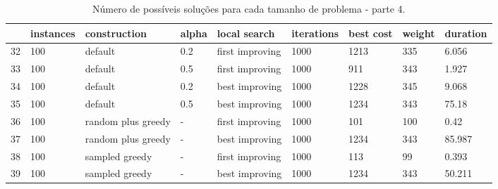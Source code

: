 \begin{landscape}
    \begin{table}
    \centering
    \begin{tabular}{lllllllll}
    \toprule
    {} & instances &        construction & alpha &     local search & iterations & best cost & weight & duration \\
    \midrule
    32 &       100 &             default &   0.2 &  first improving &       1000 &      1213 &    335 &    6.056 \\
    33 &       100 &             default &   0.5 &  first improving &       1000 &       911 &    343 &    1.927 \\
    34 &       100 &             default &   0.2 &   best improving &       1000 &      1228 &    345 &    9.068 \\
    35 &       100 &             default &   0.5 &   best improving &       1000 &      1234 &    343 &    75.18 \\
    36 &       100 &  random plus greedy &     - &  first improving &       1000 &       101 &    100 &     0.42 \\
    37 &       100 &  random plus greedy &     - &   best improving &       1000 &      1234 &    343 &   85.987 \\
    38 &       100 &      sampled greedy &     - &  first improving &       1000 &       113 &     99 &    0.393 \\
    39 &       100 &      sampled greedy &     - &   best improving &       1000 &      1234 &    343 &   50.211 \\
    \bottomrule
    \end{tabular}
    \caption{Número de possíveis soluções para cada tamanho de problema - parte 4.}
    \label{table:all-data-4}
    \end{table}


\end{landscape}
